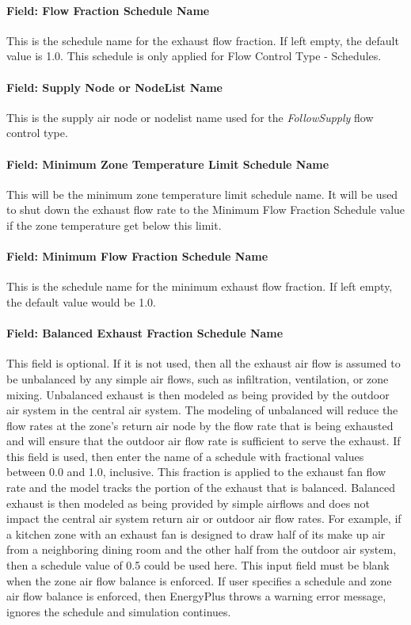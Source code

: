 \paragraph{Field: Flow Fraction Schedule Name}

This is the schedule name for the exhaust flow fraction. If left empty, the default value is 1.0. This schedule is only applied for Flow Control Type - Schedules.

\paragraph{Field: Supply Node or NodeList Name}

This is the supply air node or nodelist name used for the \emph{FollowSupply} flow control type.

\paragraph{Field: Minimum Zone Temperature Limit Schedule Name}

This will be the minimum zone temperature limit schedule name. It will be used to shut down the exhaust flow rate to the Minimum Flow Fraction Schedule value if the zone temperature get below this limit.

\paragraph{Field: Minimum Flow Fraction Schedule Name}

This is the schedule name for the minimum exhaust flow fraction. If left empty, the default value would be 1.0.

\paragraph{Field: Balanced Exhaust Fraction Schedule Name}

This field is optional. If it is not used, then all the exhaust air flow is assumed to be unbalanced by any simple air flows, such as infiltration, ventilation, or zone mixing. Unbalanced exhaust is then modeled as being provided by the outdoor air system in the central air system. The modeling of unbalanced will reduce the flow rates at the zone’s return air node by the flow rate that is being exhausted and will ensure that the outdoor air flow rate is sufficient to serve the exhaust. If this field is used, then enter the name of a schedule with fractional values between 0.0 and 1.0, inclusive. This fraction is applied to the exhaust fan flow rate and the model tracks the portion of the exhaust that is balanced. Balanced exhaust is then modeled as being provided by simple airflows and does not impact the central air system return air or outdoor air flow rates. For example, if a kitchen zone with an exhaust fan is designed to draw half of its make up air from a neighboring dining room and the other half from the outdoor air system, then a schedule value of 0.5 could be used here. This input field must be blank when the zone air flow balance is enforced. If user specifies a schedule and zone air flow balance is enforced, then EnergyPlus throws a warning error message, ignores the schedule and simulation continues.

